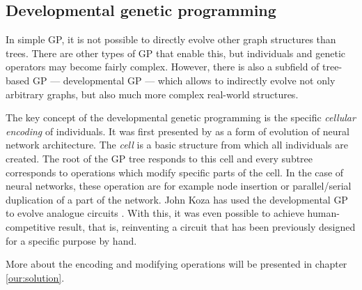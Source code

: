 \subsection{Developmental genetic programming}
In simple GP, it is not possible to directly evolve other graph structures
than trees. There are other types of GP that enable this, but individuals
and genetic operators may become fairly complex. However, there is also a
subfield of tree-based GP --- developmental GP --- which allows to indirectly
evolve not only arbitrary graphs, but also much more complex real-world
structures.

The key concept of the developmental genetic programming is the
specific \emph{cellular encoding} of individuals. It was first presented by
\cite{Gruau:1994:thesis} as a form of evolution of neural network architecture.
The \emph{cell} is a basic structure from which all individuals are created.
The root of the GP tree responds to this cell and every subtree corresponds
to operations which modify specific parts of the cell. In the case of neural
networks, these operation are for example node insertion or parallel/serial
duplication of a part of the network. John Koza has used the developmental GP
to evolve analogue circuits \citep{Koza:1998:circuits}. With this, it was even
possible to achieve human-competitive result, that is, reinventing a circuit
that has been previously designed for a specific purpose by hand.

More about the encoding and modifying operations will be presented in
chapter \ref{our:solution}.

